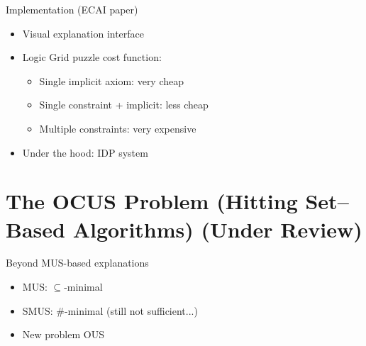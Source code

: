 \documentclass[12pt,aspectratio=169]{beamer}
\newcommand\m[1]{\ensuremath{#1}\xspace}
\begin{document}
\begin{frame}{Implementation (ECAI paper)}
 \begin{itemize}
 \item Visual explanation interface
 \item Logic Grid puzzle cost function: 
 \begin{itemize}
 \item Single implicit axiom: very cheap
 \item Single constraint + implicit: less cheap
 \item Multiple constraints: very expensive
 \end{itemize}
\pause 
  \item Under the hood: IDP system \cite{IDP} %
\end{itemize}


\end{frame}





\section{The OCUS Problem (Hitting Set--Based Algorithms) (Under Review)} 


\begin{frame}{Beyond MUS-based explanations}
 \begin{itemize}
  \item MUS: $\subseteq$-minimal
  \item SMUS: $\#$-minimal (still not sufficient...) 
  \pause
  \item New problem OUS
 \end{itemize}
\end{frame}


\newcommand\nat{\m{\mathbb{N}}}
 \newcommand\formula{\m{T}}
 \newcommand\subsetT{\m{\mathcal{S}}}
 \newcommand\ltrue{\m{\textbf{t}}}
 \newcommand\lfalse{\m{\textbf{f}}}
% 
\end{document}
